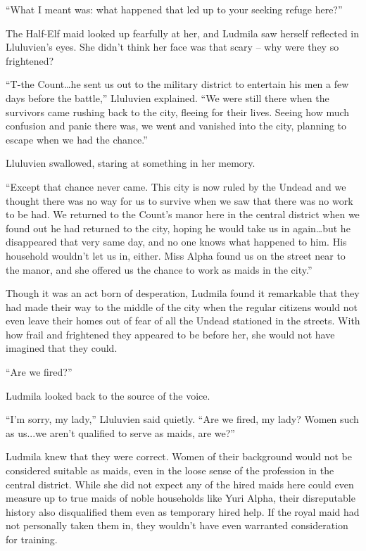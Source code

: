  

“What I meant was: what happened that led up to your seeking refuge here?”

 

The Half-Elf maid looked up fearfully at her, and Ludmila saw herself reflected in Lluluvien’s eyes. She didn’t think her face was that scary – why were they so frightened?

 

“T-the Count…he sent us out to the military district to entertain his men a few days before the battle,” Lluluvien explained. “We were still there when the survivors came rushing back to the city, fleeing for their lives. Seeing how much confusion and panic there was, we went and vanished into the city, planning to escape when we had the chance.”

 

Lluluvien swallowed, staring at something in her memory.

 

“Except that chance never came. This city is now ruled by the Undead and we thought there was no way for us to survive when we saw that there was no work to be had. We returned to the Count’s manor here in the central district when we found out he had returned to the city, hoping he would take us in again…but he disappeared that very same day, and no one knows what happened to him. His household wouldn’t let us in, either. Miss Alpha found us on the street near to the manor, and she offered us the chance to work as maids in the city.”

 

Though it was an act born of desperation, Ludmila found it remarkable that they had made their way to the middle of the city when the regular citizens would not even leave their homes out of fear of all the Undead stationed in the streets. With how frail and frightened they appeared to be before her, she would not have imagined that they could.

 

“Are we fired?”

 

Ludmila looked back to the source of the voice.

 

“I’m sorry, my lady,” Lluluvien said quietly. “Are we fired, my lady? Women such as us...we aren’t qualified to serve as maids, are we?”

 

Ludmila knew that they were correct. Women of their background would not be considered suitable as maids, even in the loose sense of the profession in the central district. While she did not expect any of the hired maids here could even measure up to true maids of noble households like Yuri Alpha, their disreputable history also disqualified them even as temporary hired help. If the royal maid had not personally taken them in, they wouldn’t have even warranted consideration for training.

